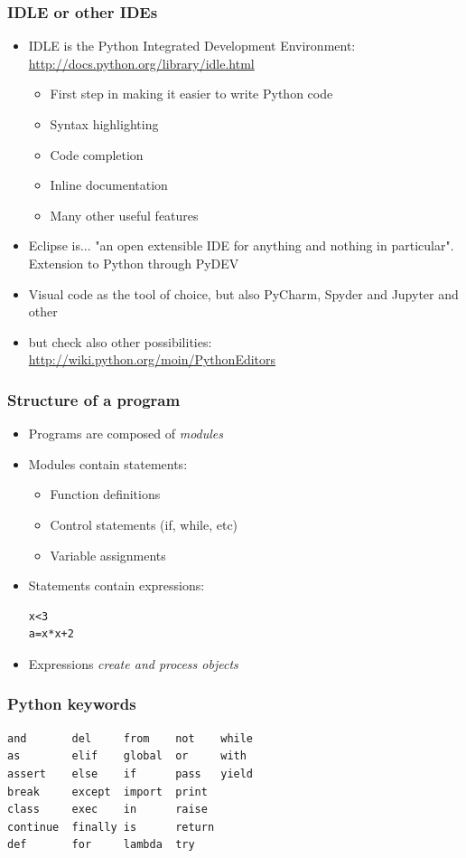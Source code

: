 \documentclass{beamer}
\begin{document}
\begin{frame}
\frametitle{IDLE or other IDEs}
\begin{itemize}
\item IDLE is the Python Integrated Development Environment: \url{http://docs.python.org/library/idle.html}
\begin{itemize}
\item First step in making it easier to write Python code
\item Syntax highlighting
\item Code completion
\item Inline documentation
\item Many other useful features
\end{itemize}
\item Eclipse is... "an open extensible IDE for anything and nothing in particular". Extension to Python through PyDEV
\item Visual code as the tool of choice, but also PyCharm, Spyder and Jupyter and other
\item but check also other possibilities: \url{http://wiki.python.org/moin/PythonEditors}
\end{itemize}
\end{frame}

\begin{frame}[containsverbatim]
\frametitle{Structure of a program}
\begin{itemize}
\item Programs are composed of {\em modules}
\item Modules contain statements:
\begin{itemize}
\item Function definitions
\item Control statements (if, while, etc)
\item Variable assignments
\end{itemize}
\item Statements contain expressions:
\begin{lstlisting}
x<3
a=x*x+2
\end{lstlisting}
\item Expressions {\em create and process objects}
\end{itemize}
\end{frame}

\begin{frame}[containsverbatim]
\frametitle{Python keywords}
\label{ref:reserved}
\begin{lstlisting}
and       del     from    not    while 
as        elif    global  or     with 
assert    else    if      pass   yield 
break     except  import  print 
class     exec    in      raise 
continue  finally is      return 
def       for     lambda  try 
\end{lstlisting}
\end{frame}
\end{document}
